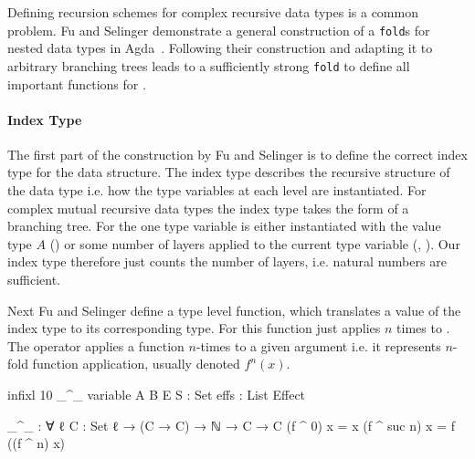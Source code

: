 Defining recursion schemes for complex recursive data types is a common problem.
Fu and Selinger demonstrate a general construction of a \texttt{fold}s for
nested data types in Agda~\cite{DBLP:journals/corr/abs-1806-05230}.
Following their construction and adapting it to arbitrary branching trees leads
to a sufficiently strong \texttt{fold} to define all important functions for
\AgdaSpace{}\AgdaSpace{}.

\paragraph{Index Type} The first part of the construction by Fu and Selinger is
to define the correct index type for the data structure.
The index type describes the recursive structure of the data type i.e. how the
type variables at each level are instantiated.
For complex mutual recursive data types the index type takes the form of a
branching tree.
For \AgdaSpace{}
the one type variable is either instantiated with the value type $A$
() or some number of
\AgdaSpace{} layers applied to
the current type variable (,
).
Our index type therefore just counts the number of
\AgdaSpace{} layers, i.e. natural numbers
are sufficient.

Next Fu and Selinger define a type level function, which translates a value of
the index type to its corresponding type.
For
\AgdaSpace{}\AgdaSpace{}
this function just applies \AgdaSpace{}
$n$ times to .
The operator \AgdaFunction{\_\textasciicircum\_} applies a function $n$-times to
a given argument  i.e. it represents $n$-fold function
application, usually denoted $f^n(x)$.

\begin{code}[hide]
infixl 10 _^_
variable
  A B E S : Set
  effs : List Effect
\end{code}
\begin{code}
_^_ : ∀ {ℓ} {C : Set ℓ} → (C → C) → ℕ → C → C
(f ^ 0)      x = x
(f ^ suc n)  x = f ((f ^ n) x)
\end{code}

